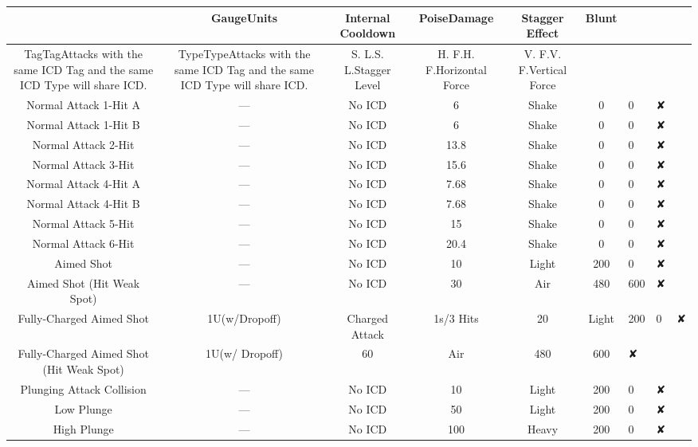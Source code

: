 \documentclass[a4paper,12pt]{article}
\begin{document}
\begin{tabular}{|c|c|c|c|c|c|} \hline
 & GaugeUnits & Internal Cooldown & PoiseDamage & Stagger Effect & Blunt \\
 \hline
TagTagAttacks with the same ICD Tag and the same ICD Type will share ICD. & TypeTypeAttacks with the same ICD Tag and the same ICD Type will share ICD. & S. L.S. L.Stagger Level & H. F.H. F.Horizontal Force & V. F.V. F.Vertical Force \\
Normal Attack 1-Hit A & — & No ICD & 6 & Shake & 0 & 0 & ✘ \\
Normal Attack 1-Hit B & — & No ICD & 6 & Shake & 0 & 0 & ✘ \\
Normal Attack 2-Hit & — & No ICD & 13.8 & Shake & 0 & 0 & ✘ \\
Normal Attack 3-Hit & — & No ICD & 15.6 & Shake & 0 & 0 & ✘ \\
Normal Attack 4-Hit A & — & No ICD & 7.68 & Shake & 0 & 0 & ✘ \\
Normal Attack 4-Hit B & — & No ICD & 7.68 & Shake & 0 & 0 & ✘ \\
Normal Attack 5-Hit & — & No ICD & 15 & Shake & 0 & 0 & ✘ \\
Normal Attack 6-Hit & — & No ICD & 20.4 & Shake & 0 & 0 & ✘ \\
Aimed Shot & — & No ICD & 10 & Light & 200 & 0 & ✘ \\
Aimed Shot (Hit Weak Spot) & — & No ICD & 30 & Air & 480 & 600 & ✘ \\
Fully-Charged Aimed Shot & 1U(w/Dropoff) & Charged Attack & 1s/3 Hits & 20 & Light & 200 & 0 & ✘ \\
Fully-Charged Aimed Shot (Hit Weak Spot) & 1U(w/ Dropoff) & 60 & Air & 480 & 600 & ✘ \\
Plunging Attack Collision & — & No ICD & 10 & Light & 200 & 0 & ✘ \\
Low Plunge & — & No ICD & 50 & Light & 200 & 0 & ✘ \\
High Plunge & — & No ICD & 100 & Heavy & 200 & 0 & ✘ \\
\end{tabular}\\ \par \vspace{0.5cm}
\end{document}
